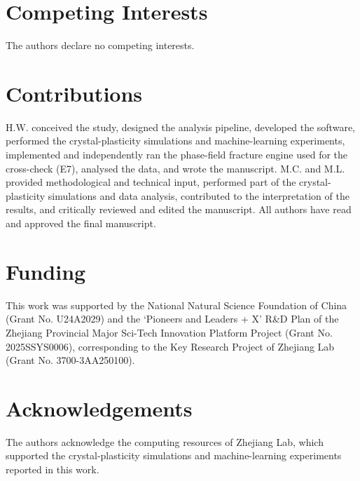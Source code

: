 \documentclass[11pt]{article}
\begin{document}
\section*{Competing Interests}

The authors declare no competing interests.

\section*{Contributions}

H.W. conceived the study, designed the analysis pipeline, developed the software, performed the crystal-plasticity simulations and machine-learning experiments, implemented and independently ran the phase-field fracture engine used for the cross-check (E7), analysed the data, and wrote the manuscript. M.C. and M.L. provided methodological and technical input, performed part of the crystal-plasticity simulations and data analysis, contributed to the interpretation of the results, and critically reviewed and edited the manuscript. All authors have read and approved the final manuscript.

\section*{Funding}

This work was supported by the National Natural Science Foundation of China (Grant No. U24A2029) and the `Pioneers and Leaders + X' R\&D Plan of the Zhejiang Provincial Major Sci-Tech Innovation Platform Project (Grant No. 2025SSYS0006), corresponding to the Key Research Project of Zhejiang Lab (Grant No. 3700-3AA250100).

\section*{Acknowledgements}

The authors acknowledge the computing resources of Zhejiang Lab, which supported the crystal-plasticity simulations and machine-learning experiments reported in this work.
\end{document}
